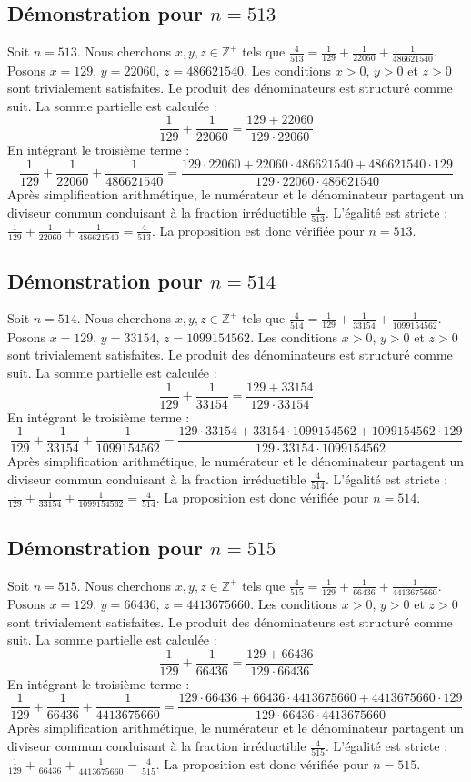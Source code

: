 \documentclass[11pt,a4paper]{article}
\begin{document}
\subsection{Démonstration pour $n = 513$}
Soit $n = 513$. Nous cherchons $x, y, z \in \mathbb{Z}^{+}$ tels que $\frac{4}{513} = \frac{1}{129} + \frac{1}{22060} + \frac{1}{486621540}$.
Posons $x = 129$, $y = 22060$, $z = 486621540$.
Les conditions $x > 0$, $y > 0$ et $z > 0$ sont trivialement satisfaites.
Le produit des dénominateurs est structuré comme suit. La somme partielle est calculée :
$$ \frac{1}{129} + \frac{1}{22060} = \frac{129+22060}{129 \cdot 22060} $$
En intégrant le troisième terme :
$$ \frac{1}{129} + \frac{1}{22060} + \frac{1}{486621540} = \frac{129 \cdot 22060 + 22060 \cdot 486621540 + 486621540 \cdot 129}{129 \cdot 22060 \cdot 486621540} $$
Après simplification arithmétique, le numérateur et le dénominateur partagent un diviseur commun conduisant à la fraction irréductible $\frac{4}{513}$.
L'égalité est stricte : $\frac{1}{129} + \frac{1}{22060} + \frac{1}{486621540} = \frac{4}{513}$.
La proposition est donc vérifiée pour $n = 513$.
\subsection{Démonstration pour $n = 514$}
Soit $n = 514$. Nous cherchons $x, y, z \in \mathbb{Z}^{+}$ tels que $\frac{4}{514} = \frac{1}{129} + \frac{1}{33154} + \frac{1}{1099154562}$.
Posons $x = 129$, $y = 33154$, $z = 1099154562$.
Les conditions $x > 0$, $y > 0$ et $z > 0$ sont trivialement satisfaites.
Le produit des dénominateurs est structuré comme suit. La somme partielle est calculée :
$$ \frac{1}{129} + \frac{1}{33154} = \frac{129+33154}{129 \cdot 33154} $$
En intégrant le troisième terme :
$$ \frac{1}{129} + \frac{1}{33154} + \frac{1}{1099154562} = \frac{129 \cdot 33154 + 33154 \cdot 1099154562 + 1099154562 \cdot 129}{129 \cdot 33154 \cdot 1099154562} $$
Après simplification arithmétique, le numérateur et le dénominateur partagent un diviseur commun conduisant à la fraction irréductible $\frac{4}{514}$.
L'égalité est stricte : $\frac{1}{129} + \frac{1}{33154} + \frac{1}{1099154562} = \frac{4}{514}$.
La proposition est donc vérifiée pour $n = 514$.
\subsection{Démonstration pour $n = 515$}
Soit $n = 515$. Nous cherchons $x, y, z \in \mathbb{Z}^{+}$ tels que $\frac{4}{515} = \frac{1}{129} + \frac{1}{66436} + \frac{1}{4413675660}$.
Posons $x = 129$, $y = 66436$, $z = 4413675660$.
Les conditions $x > 0$, $y > 0$ et $z > 0$ sont trivialement satisfaites.
Le produit des dénominateurs est structuré comme suit. La somme partielle est calculée :
$$ \frac{1}{129} + \frac{1}{66436} = \frac{129+66436}{129 \cdot 66436} $$
En intégrant le troisième terme :
$$ \frac{1}{129} + \frac{1}{66436} + \frac{1}{4413675660} = \frac{129 \cdot 66436 + 66436 \cdot 4413675660 + 4413675660 \cdot 129}{129 \cdot 66436 \cdot 4413675660} $$
Après simplification arithmétique, le numérateur et le dénominateur partagent un diviseur commun conduisant à la fraction irréductible $\frac{4}{515}$.
L'égalité est stricte : $\frac{1}{129} + \frac{1}{66436} + \frac{1}{4413675660} = \frac{4}{515}$.
La proposition est donc vérifiée pour $n = 515$.
\end{document}
